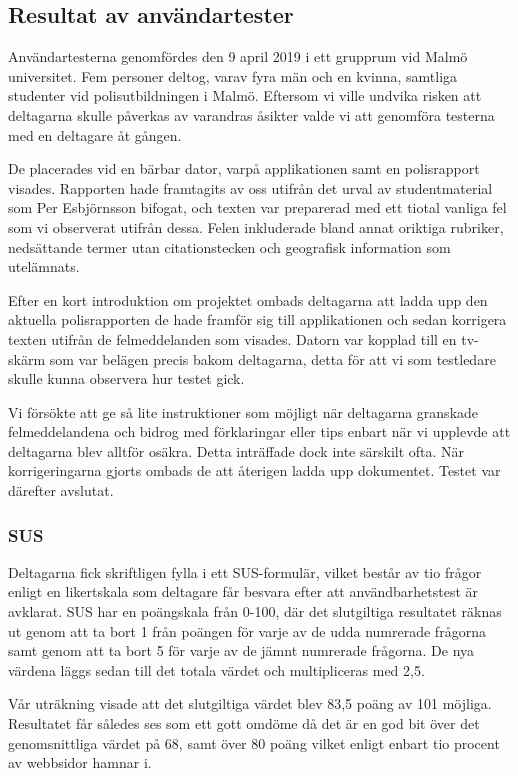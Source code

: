 \documentclass[swedish]{maucsthesis}
\begin{document}
\subsection{Resultat av användartester}

Användartesterna genomfördes den 9 april 2019 i ett grupprum vid Malmö
universitet. Fem personer deltog, varav fyra män och en kvinna, samtliga
studenter vid polisutbildningen i Malmö. Eftersom vi ville undvika risken att
deltagarna skulle påverkas av varandras åsikter valde vi att genomföra testerna
med en deltagare åt gången.

De placerades vid en bärbar dator, varpå applikationen samt en polisrapport
visades. Rapporten hade framtagits av oss utifrån det urval av studentmaterial
som Per Esbjörnsson bifogat, och texten var preparerad med ett tiotal vanliga
fel som vi observerat utifrån dessa. Felen inkluderade bland annat oriktiga
rubriker, nedsättande termer utan citationstecken och geografisk information som
utelämnats.

Efter en kort introduktion om projektet ombads deltagarna att ladda upp den
aktuella polisrapporten de hade framför sig till applikationen och sedan
korrigera texten utifrån de felmeddelanden som visades. Datorn var kopplad till
en tv-skärm som var belägen precis bakom deltagarna, detta för att vi som
testledare skulle kunna observera hur testet gick.

Vi försökte att ge så lite instruktioner som möjligt när deltagarna granskade
felmeddelandena och bidrog med förklaringar eller tips enbart när vi upplevde
att deltagarna blev alltför osäkra. Detta inträffade dock inte särskilt ofta.
När korrigeringarna gjorts ombads de att återigen ladda upp dokumentet. Testet
var därefter avslutat.

\subsubsection{SUS}

Deltagarna fick skriftligen fylla i ett SUS-formulär, vilket består av tio
frågor enligt en likertskala som deltagare får besvara efter att
användbarhetstest är avklarat. SUS har en poängskala från 0-100, där det
slutgiltiga resultatet räknas ut genom att ta bort 1 från poängen för varje av
de udda numrerade frågorna samt genom att ta bort 5 för varje av de jämnt
numrerade frågorna. De nya värdena läggs sedan till det totala värdet och
multipliceras med 2,5.

Vår uträkning visade att det slutgiltiga värdet blev 83,5 poäng av 101 möjliga.
Resultatet får således ses som ett gott omdöme då det är en god bit över det
genomsnittliga värdet på 68, samt över 80 poäng vilket enligt
\cite{laubheimer:2018} enbart tio procent av webbsidor hamnar i.
\end{document}

